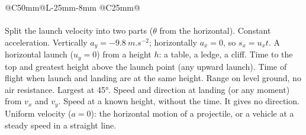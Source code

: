 {\small
\setlength\LTpre{4pt}\setlength\LTpost{6pt}
\renewcommand\arraystretch{1.1}
\begin{longtable}{@{}C{50mm}@{\hspace{4mm}}L{\dimexpr\linewidth-50mm-25mm-8mm\relax}%
    @{\hspace{4mm}}C{25mm}@{}}
  \fshead\\\hline\endfirsthead
  \fshead\\\hline\endhead
    {Split the launch velocity into two parts ($\theta$ from the horizontal).}
    {Constant acceleration. Vertically $a_y = \qty{-9.8}{m.s^{-2}}$; horizontally
     $a_x = 0$, so $s_x = u_x t$.}
    {A horizontal launch ($u_y = 0$) from a height $h$: a table, a ledge, a cliff.}
    {Time to the top and greatest height above the launch point (any upward launch).}
    {Time of flight when launch and landing are at the same height.}
    {Range on level ground, no air resistance. Largest at \ang{45}.}
    {Speed and direction at landing (or any moment) from $v_x$ and $v_y$.}
    {Speed at a known height, without the time. It gives no direction.}
    {Uniform velocity ($a = 0$): the horizontal motion of a projectile, or a vehicle at a
     steady speed in a straight line.}
\end{longtable}}
